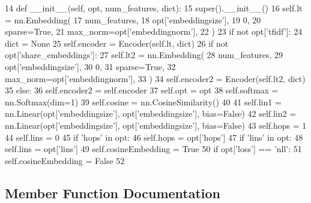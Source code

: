 \begin{DoxyCode}
14     \textcolor{keyword}{def }\_\_init\_\_(self, opt, num\_features, dict):
15         super().\_\_init\_\_()
16         self.lt = nn.Embedding(
17             num\_features,
18             opt[\textcolor{stringliteral}{'embeddingsize'}],
19             0,
20             sparse=\textcolor{keyword}{True},
21             max\_norm=opt[\textcolor{stringliteral}{'embeddingnorm'}],
22         )
23         \textcolor{keywordflow}{if} \textcolor{keywordflow}{not} opt[\textcolor{stringliteral}{'tfidf'}]:
24             dict = \textcolor{keywordtype}{None}
25         self.encoder = Encoder(self.lt, dict)
26         \textcolor{keywordflow}{if} \textcolor{keywordflow}{not} opt[\textcolor{stringliteral}{'share\_embeddings'}]:
27             self.lt2 = nn.Embedding(
28                 num\_features,
29                 opt[\textcolor{stringliteral}{'embeddingsize'}],
30                 0,
31                 sparse=\textcolor{keyword}{True},
32                 max\_norm=opt[\textcolor{stringliteral}{'embeddingnorm'}],
33             )
34             self.encoder2 = Encoder(self.lt2, dict)
35         \textcolor{keywordflow}{else}:
36             self.encoder2 = self.encoder
37         self.opt = opt
38         self.softmax = nn.Softmax(dim=1)
39         self.cosine = nn.CosineSimilarity()
40 
41         self.lin1 = nn.Linear(opt[\textcolor{stringliteral}{'embeddingsize'}], opt[\textcolor{stringliteral}{'embeddingsize'}], bias=\textcolor{keyword}{False})
42         self.lin2 = nn.Linear(opt[\textcolor{stringliteral}{'embeddingsize'}], opt[\textcolor{stringliteral}{'embeddingsize'}], bias=\textcolor{keyword}{False})
43         self.hops = 1
44         self.lins = 0
45         \textcolor{keywordflow}{if} \textcolor{stringliteral}{'hops'} \textcolor{keywordflow}{in} opt:
46             self.hops = opt[\textcolor{stringliteral}{'hops'}]
47         \textcolor{keywordflow}{if} \textcolor{stringliteral}{'lins'} \textcolor{keywordflow}{in} opt:
48             self.lins = opt[\textcolor{stringliteral}{'lins'}]
49         self.cosineEmbedding = \textcolor{keyword}{True}
50         \textcolor{keywordflow}{if} opt[\textcolor{stringliteral}{'loss'}] == \textcolor{stringliteral}{'nll'}:
51             self.cosineEmbedding = \textcolor{keyword}{False}
52 
\end{DoxyCode}


\subsection{Member Function Documentation}
\mbox{\label{classprojects_1_1personachat_1_1kvmemnn_1_1modules_1_1Kvmemnn_aabb15e2db27624863502c19e647bdbda}} 
